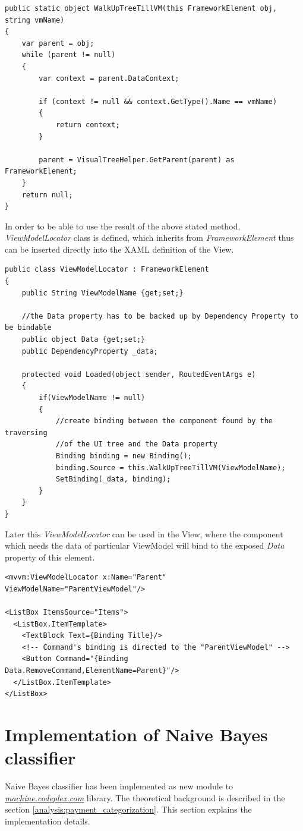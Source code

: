 \begin{verbatim}
public static object WalkUpTreeTillVM(this FrameworkElement obj, string vmName)
{
    var parent = obj;
    while (parent != null)
    {
        var context = parent.DataContext;

        if (context != null && context.GetType().Name == vmName)
        {
            return context;
        }

        parent = VisualTreeHelper.GetParent(parent) as FrameworkElement;
    }
    return null;
}
\end{verbatim}
In order to be able to use the result of the above stated method, \textit{ViewModelLocator} class is defined, which inherits from \textit{FrameworkElement} thus can be inserted directly into the XAML definition of the View.

\begin{verbatim}
public class ViewModelLocator : FrameworkElement
{
	public String ViewModelName {get;set;}
	
	//the Data property has to be backed up by Dependency Property to be bindable
	public object Data {get;set;}
	public DependencyProperty _data;

    protected void Loaded(object sender, RoutedEventArgs e)
    {
        if(ViewModelName != null)
        {
            //create binding between the component found by the traversing 
            //of the UI tree and the Data property
            Binding binding = new Binding();
            binding.Source = this.WalkUpTreeTillVM(ViewModelName);
            SetBinding(_data, binding);   
        }
    }
}
\end{verbatim}
Later this \textit{ViewModelLocator} can be used in the View, where the component which needs the data of particular ViewModel will bind to the exposed \textit{Data} property of this element.
\begin{verbatim}
<mvvm:ViewModelLocator x:Name="Parent" ViewModelName="ParentViewModel"/>

<ListBox ItemsSource="Items">
  <ListBox.ItemTemplate>
    <TextBlock Text={Binding Title}/>
    <!-- Command's binding is directed to the "ParentViewModel" -->
    <Button Command="{Binding Data.RemoveCommand,ElementName=Parent}"/>
  </ListBox.ItemTemplate>
</ListBox>
\end{verbatim}

\section {Implementation of Naive Bayes classifier}
Naive Bayes classifier has been implemented as new module to \textit{\href{machine.codeplex.com}{machine.codeplex.com}} library. The theoretical background is described in the section \ref{analysis:payment_categorization}. This section explains the implementation details.


